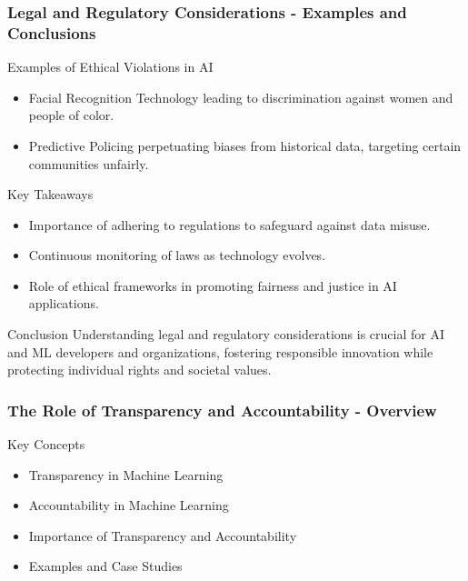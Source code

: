 \documentclass{beamer}
\begin{document}
\begin{frame}[fragile]
    \frametitle{Legal and Regulatory Considerations - Examples and Conclusions}
    \begin{block}{Examples of Ethical Violations in AI}
        \begin{itemize}
            \item Facial Recognition Technology leading to discrimination against women and people of color.
            \item Predictive Policing perpetuating biases from historical data, targeting certain communities unfairly.
        \end{itemize}
    \end{block}
    
    \begin{block}{Key Takeaways}
        \begin{itemize}
            \item Importance of adhering to regulations to safeguard against data misuse.
            \item Continuous monitoring of laws as technology evolves.
            \item Role of ethical frameworks in promoting fairness and justice in AI applications.
        \end{itemize}
    \end{block}
    
    \begin{block}{Conclusion}
        Understanding legal and regulatory considerations is crucial for AI and ML developers and organizations, fostering responsible innovation while protecting individual rights and societal values.
    \end{block}
\end{frame}

\begin{frame}[fragile]
    \frametitle{The Role of Transparency and Accountability - Overview}
    \begin{block}{Key Concepts}
        \begin{itemize}
            \item Transparency in Machine Learning
            \item Accountability in Machine Learning
            \item Importance of Transparency and Accountability
            \item Examples and Case Studies
        \end{itemize}
    \end{block}
\end{frame}
\end{document}
